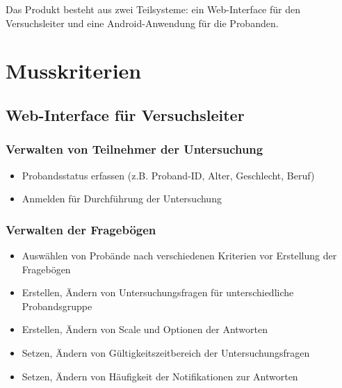\documentclass[a4paper]{scrreprt}
\begin{document}
        \noindent Das Produkt besteht aus zwei Teilsysteme: ein Web-Interface f\"ur den Versuchsleiter und eine Android-Anwendung f\"ur die Probanden.


        \section{Musskriterien}
            \vspace*{0.3cm}

            \subsection{Web-Interface f\"ur Versuchsleiter}
                \vspace*{0.2cm}

                \subsubsection{Verwalten von Teilnehmer der Untersuchung}
                    \begin{itemize}
                        \item Probandsstatus erfassen (z.B. Proband-ID, Alter, Geschlecht, Beruf)
                        \item Anmelden f\"ur Durchf\"uhrung der Untersuchung
                    \end{itemize}

                \subsubsection{Verwalten der Frageb\"ogen}
                    \begin{itemize}
                        \item Ausw\"ahlen von Prob\"ande nach verschiedenen Kriterien vor Erstellung der Frageb\"ogen
                        \item Erstellen, \"Andern von Untersuchungsfragen f\"ur unterschiedliche Probandsgruppe
                        \item Erstellen, \"Andern von Scale und Optionen der Antworten
                        \item Setzen, \"Andern von G\"ultigkeitszeitbereich der Untersuchungsfragen
                        \item Setzen, \"Andern von H\"aufigkeit der Notifikationen zur Antworten
                    \end{itemize}
\end{document}
